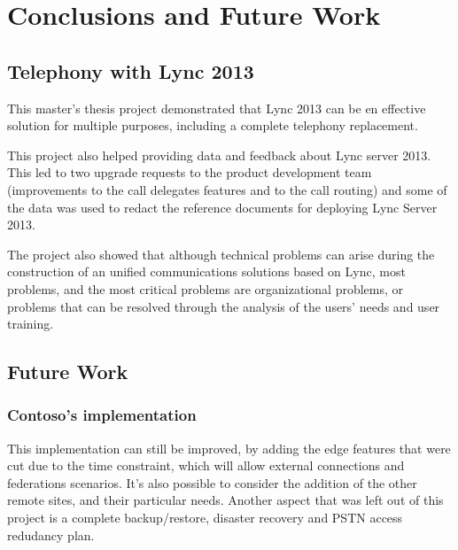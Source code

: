 	



\chapter{Conclusions and Future Work}

\section{Telephony with Lync 2013}

This master's thesis project demonstrated that Lync 2013 can be en effective solution for multiple purposes, including a complete telephony replacement. 

This project also helped providing data and feedback about Lync server 2013. This led to two upgrade requests to the product development team (improvements to the call delegates features and to the call routing) and some of the data was used to redact the reference documents for deploying Lync Server 2013.

The project also showed that although technical problems can arise during the construction of an unified communications solutions based on Lync, most problems, and the most critical problems are organizational problems, or problems that can be resolved through the analysis of the users' needs and user training.


\section{Future Work}

\subsection{Contoso's implementation}
This implementation can still be improved, by adding the edge features that were cut due to the time constraint, which will allow external connections and federations scenarios. It's also possible to consider the addition of the other remote sites, and their particular needs. Another aspect that was left out of this project is a complete backup/restore, disaster recovery and PSTN access redudancy plan.


